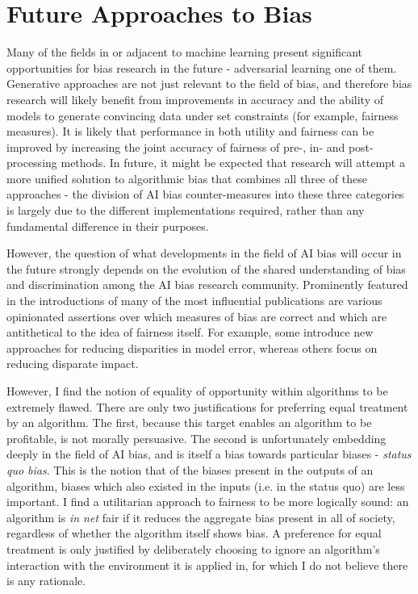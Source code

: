 \documentclass[conference]{IEEEtran}
\begin{document}
\section{Future Approaches to Bias}
Many of the fields in or adjacent to machine learning present significant opportunities for bias research in the future - adversarial learning one of them. Generative approaches are not just relevant to the field of bias, and therefore bias research will likely benefit from improvements in accuracy and the ability of models to generate convincing data under set constraints (for example, fairness measures). It is likely that performance in both utility and fairness can be improved by increasing the joint accuracy of fairness of pre-, in- and post-processing methods. In future, it might be expected that research will attempt a more unified solution to algorithmic bias that combines all three of these approaches - the division of AI bias counter-measures into these three categories is largely due to the different implementations required, rather than any fundamental difference in their purposes.

However, the question of what developments in the field of AI bias will occur in the future strongly depends on the evolution of the shared understanding of bias and discrimination among the AI bias research community. Prominently featured in the introductions of many of the most influential publications are various opinionated assertions over which measures of bias are correct and which are antithetical to the idea of fairness itself. For example, some introduce new approaches for reducing disparities in model error\cite{chouldechova2016fair}, whereas others focus on reducing disparate impact\cite{feldman2015certifying}. 

However, I find the notion of equality of opportunity within algorithms to be extremely flawed. There are only two justifications for preferring equal treatment by an algorithm. The first, because this target enables an algorithm to be profitable, is not morally persuasive. The second is unfortunately embedding deeply in the field of AI bias, and is itself a bias towards particular biases - \emph{status quo bias}. This is the notion that of the biases present in the outputs of an algorithm, biases which also existed in the inputs (i.e. in the status quo) are less important. I find a utilitarian approach to fairness to be more logically sound: an algorithm is \emph{in net} fair if it reduces the aggregate bias present in all of society, regardless of whether the algorithm itself shows bias. A preference for equal treatment is only justified by deliberately choosing to ignore an algorithm's interaction with the environment it is applied in, for which I do not believe there is any rationale.
\end{document}
